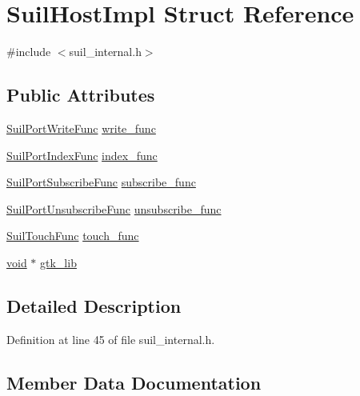 \hypertarget{struct_suil_host_impl}{}\section{Suil\+Host\+Impl Struct Reference}
\label{struct_suil_host_impl}


{\ttfamily \#include $<$suil\+\_\+internal.\+h$>$}

\subsection*{Public Attributes}
\begin{DoxyCompactItemize}
\item 
\hyperlink{group__suil_ga2da768960d0b91c1515288387f4e5582}{Suil\+Port\+Write\+Func} \hyperlink{struct_suil_host_impl_aec41a31fe5d52c8b122aa01d3f0a5e0a}{write\+\_\+func}
\item 
\hyperlink{group__suil_ga94e7dc09d4747a1d40f69ff4bef1e242}{Suil\+Port\+Index\+Func} \hyperlink{struct_suil_host_impl_a6d8895a2204e86cf0dfa6ab9e2792d23}{index\+\_\+func}
\item 
\hyperlink{group__suil_gab178a917cd59601d1c54121638dc8a3a}{Suil\+Port\+Subscribe\+Func} \hyperlink{struct_suil_host_impl_a854a56a27df533538c1fbf8aebb07d04}{subscribe\+\_\+func}
\item 
\hyperlink{group__suil_gaa38ef1f02fde6358c58b5c533b916797}{Suil\+Port\+Unsubscribe\+Func} \hyperlink{struct_suil_host_impl_af6a3e9fc9c19f365302f988e7b550291}{unsubscribe\+\_\+func}
\item 
\hyperlink{group__suil_gaf64d2d3854b4fbe2de355407e5899aeb}{Suil\+Touch\+Func} \hyperlink{struct_suil_host_impl_a9b3d3563bc02b0e98fbf0d461a56d613}{touch\+\_\+func}
\item 
\hyperlink{sound_8c_ae35f5844602719cf66324f4de2a658b3}{void} $\ast$ \hyperlink{struct_suil_host_impl_aa85e46c4f617993944d7475025da033e}{gtk\+\_\+lib}
\end{DoxyCompactItemize}


\subsection{Detailed Description}


Definition at line 45 of file suil\+\_\+internal.\+h.



\subsection{Member Data Documentation}
